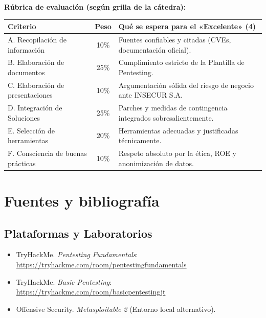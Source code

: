 \documentclass[11pt,a4paper]{article}
\begin{document}
\textbf{Rúbrica de evaluación (según grilla de la cátedra):}
\begin{center}
\renewcommand{\arraystretch}{1.2}
\begin{tabularx}{\textwidth}{@{} l c X @{}}
\toprule
\textbf{Criterio} & \textbf{Peso} & \textbf{Qué se espera para el «Excelente» (4)} \\
\midrule
A. Recopilación de información & 10\% & Fuentes confiables y citadas (CVEs, documentación oficial). \\
B. Elaboración de documentos & 25\% & Cumplimiento estricto de la Plantilla de Pentesting. \\
C. Elaboración de presentaciones & 10\% & Argumentación sólida del riesgo de negocio ante INSECUR S.A. \\
D. Integración de Soluciones & 25\% & Parches y medidas de contingencia integrados sobresalientemente. \\
E. Selección de herramientas & 20\% & Herramientas adecuadas y justificadas técnicamente. \\
F. Consciencia de buenas prácticas & 10\% & Respeto absoluto por la ética, ROE y anonimización de datos. \\
\bottomrule
\end{tabularx}
\end{center}

\section{Fuentes y bibliografía}

\subsection{Plataformas y Laboratorios}
\begin{itemize}[leftmargin=*]
  \item TryHackMe. \textit{Pentesting Fundamentals}: \url{https://tryhackme.com/room/pentestingfundamentals}
  \item TryHackMe. \textit{Basic Pentesting}: \url{https://tryhackme.com/room/basicpentestingjt}
  \item Offensive Security. \textit{Metasploitable 2} (Entorno local alternativo).
\end{itemize}
\end{document}
